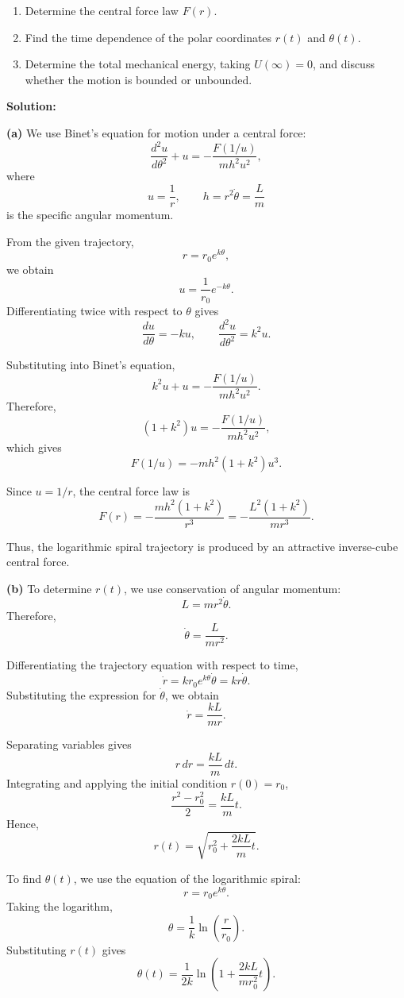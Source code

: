 \documentclass[12pt]{article}
\begin{document}
\begin{enumerate}
    \item[(a)] Determine the central force law $F(r)$.
    \item[(b)] Find the time dependence of the polar coordinates
    $r(t)$ and $\theta(t)$.
    \item[(c)] Determine the total mechanical energy, taking
    $U(\infty)=0$, and discuss whether the motion is bounded
    or unbounded.
\end{enumerate}

\textbf{Solution:}

\textbf{(a)} We use Binet's equation for motion under a central force:
\[
\frac{d^2u}{d\theta^2}+u
=-\frac{F(1/u)}{mh^2u^2},
\]
where
\[
u=\frac{1}{r},
\qquad
h=r^2\dot{\theta}=\frac{L}{m}
\]
is the specific angular momentum.

From the given trajectory,
\[
r=r_0e^{k\theta},
\]
we obtain
\[
u=\frac{1}{r_0}e^{-k\theta}.
\]
Differentiating twice with respect to $\theta$ gives
\[
\frac{du}{d\theta}=-ku,
\qquad
\frac{d^2u}{d\theta^2}=k^2u.
\]

Substituting into Binet's equation,
\[
k^2u+u=-\frac{F(1/u)}{mh^2u^2}.
\]
Therefore,
\[
(1+k^2)u=-\frac{F(1/u)}{mh^2u^2},
\]
which gives
\[
F(1/u)=-mh^2(1+k^2)u^3.
\]

Since $u=1/r$, the central force law is
\[
\boxed{
F(r)=-\frac{mh^2(1+k^2)}{r^3}
=-\frac{L^2(1+k^2)}{mr^3}.
}
\]

Thus, the logarithmic spiral trajectory is produced by an
attractive inverse-cube central force.

\textbf{(b)} To determine $r(t)$, we use conservation of
angular momentum:
\[
L=mr^2\dot{\theta}.
\]
Therefore,
\[
\dot{\theta}=\frac{L}{mr^2}.
\]

Differentiating the trajectory equation with respect to time,
\[
\dot{r}=kr_0e^{k\theta}\dot{\theta}
=kr\dot{\theta}.
\]
Substituting the expression for $\dot{\theta}$,
we obtain
\[
\boxed{\dot{r}=\frac{kL}{mr}.}
\]

Separating variables gives
\[
r\,dr=\frac{kL}{m}\,dt.
\]
Integrating and applying the initial condition $r(0)=r_0$,
\[
\frac{r^2-r_0^2}{2}=\frac{kL}{m}t.
\]
Hence,
\[
\boxed{
r(t)=\sqrt{r_0^2+\frac{2kL}{m}t}.
}
\]

To find $\theta(t)$, we use the equation of the logarithmic spiral:
\[
r=r_0e^{k\theta}.
\]
Taking the logarithm,
\[
\theta=\frac{1}{k}\ln\left(\frac{r}{r_0}\right).
\]
Substituting $r(t)$ gives
\[
\boxed{
\theta(t)=\frac{1}{2k}
\ln\left(1+\frac{2kL}{mr_0^2}t\right).
}
\]
\end{document}
